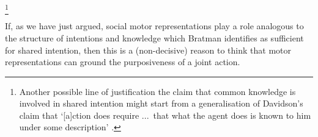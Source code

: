 \documentclass[12pt,\papersize]{extarticle}
\begin{document}
\footnote{
Another possible line of justification the claim that common knowledge is involved in shared intention might start from a generalisation of Davidson's claim that
`[a]ction does require %
...\ that what the agent does is known to him under some description' \citep[p.\ 50]{Davidson:1971fz}.
} 

If, as we have just argued, social motor representations play a role analogous to the structure of intentions and knowledge which Bratman identifies as sufficient for shared intention, then this is a  (non-decisive)  reason to think that motor representations can ground the purposiveness of a joint action.
\end{document}
